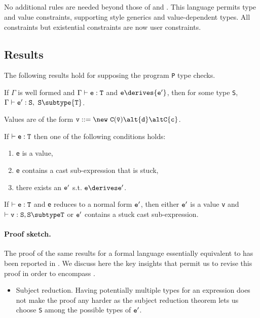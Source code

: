 {\subsection{\FXGD} 

No additional rules are needed beyond those of \FXG{} and \FXD{}. This
language permits type and value constraints, supporting \FGJ{} style
generics and value-dependent types. All constraints but existential constraints are now user constraints.

\subsection{Results}
The following results hold for \FXGD supposing the program {\tt P} type checks.

\begin{theorem} If $\Gamma$ is well formed and $\Gamma \vdash {\tt e:T}$ and ${\tt e} \derives {\tt e'}$, then
for some type {\tt S}, $\Gamma \vdash {\tt {\tt e}':{\tt S}}\comma{\tt S} \subtype {\tt T}$.
\end{theorem}

Values are of the form $\tt v ::= \new\ C(\bar{\tt v}) \alt {\tt d} \alt C\{c\}$.

\begin{theorem}[Progress]
If $\vdash {\tt e:T}$ then one of the following conditions holds:
\begin{enumerate}
\item {\tt e} is a value,
\item {\tt e} contains a cast sub-expression that is stuck,
\item there exists an $\tt e'$ s.t. $\tt e\derives e'$.
\end{enumerate}
\end{theorem}

\begin{theorem}
If $\vdash {\tt e:T}$ and {\tt e}
reduces to a normal form ${\tt e'}$, then
either $\tt e'$ is a value {\tt v} and $\vdash {\tt v:S},{\tt S\subtype T}$ or
${\tt e'}$ contains  a stuck cast sub-expression.
\end{theorem}

\paragraph{Proof sketch.} The proof of the same results for a
formal language essentially equivalent to \FXD{} has been
reported in \cite{constrained-types}. We discuss here the key
insights that permit us to revise this proof in order to encompass \FXGD{}.
\begin{itemize}
\item Subject reduction. Having potentially multiple types for
an expression does not make the proof any harder as the subject
reduction theorem lets us choose {\tt S} among the possible types of ${\tt e}'$.


\end{itemize}}
